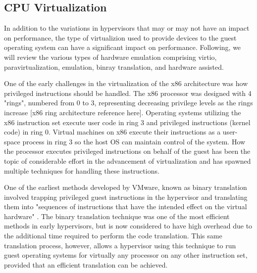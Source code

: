 \subsection{CPU Virtualization}
\label{sec:vt_cpu}
In addition to the variations in hypervisors that may or may not have an impact on performance, the 
type of virtualizion used to provide devices to the guest operating system can have a significant impact
on performance.  Following, we will review the various types of hardware emulation comprising virtio, 
paravirtualization, emulation, binray translation, and hardware assisted.

One of the early challenges in the virtualization of the x86 architecture was how privileged instructions should be handled.  The x86 processor was designed with 4 "rings", numbered from 0 to 3, representing decreasing privilege levels as the rings increase [x86 ring architecture reference here].   Operating systems utilizing the x86 instruction set execute user code in ring 3 and privileged instructions (kernel code) in ring 0.  Virtual machines on x86 execute their instructions as a user-space process in ring 3 so the host OS can maintain control of the system.  How the processor executes privileged instructions on behalf of the guest has been the topic of considerable effort in the advancement of virtualization and has spawned multiple techniques for handling these instructions. 

One of the earliest methods developed by VMware, known as binary translation involved trapping privileged guest instructions in the hypervisor and translating them into "sequences of instructions that have the intended effect on the virtual hardware" \autocite{_vmware_1}.  The binary translation technique was one of the most efficient methods in early hypervisors, but is now considered to have high overhead due to the additional time required to perform the code translation.  This same translation process, however, allows a hypervisor using this technique to run guest operating systems for virtually any processor on any other instruction set, provided that an efficient translation can be achieved. 

